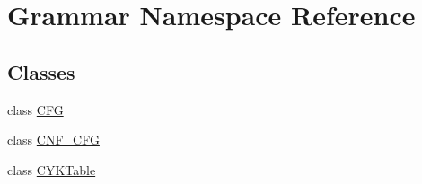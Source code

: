 \hypertarget{namespaceGrammar}{\section{\-Grammar \-Namespace \-Reference}
\label{d0/da6/namespaceGrammar}
}
\subsection*{\-Classes}
\begin{DoxyCompactItemize}
\item 
class \hyperlink{classGrammar_1_1CFG}{\-C\-F\-G}
\item 
class \hyperlink{classGrammar_1_1CNF__CFG}{\-C\-N\-F\-\_\-\-C\-F\-G}
\item 
class \hyperlink{classGrammar_1_1CYKTable}{\-C\-Y\-K\-Table}
\end{DoxyCompactItemize}
